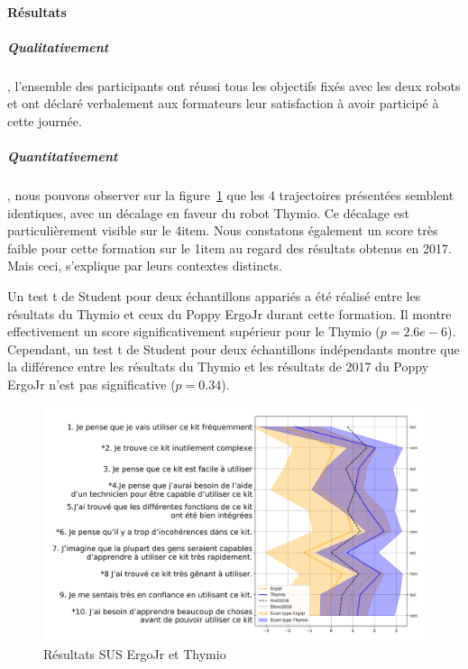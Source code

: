         \paragraph{Résultats}
            \subparagraph{Qualitativement},
                l'ensemble des participants ont réussi tous les objectifs fixés avec les deux robots et ont déclaré verbalement aux formateurs leur satisfaction à avoir participé à cette journée.
            \subparagraph{Quantitativement},
                nous pouvons observer sur la figure~\ref{fig:sus_vs_thymio} que les 4 trajectoires présentées semblent identiques, avec un décalage en faveur du robot Thymio. Ce décalage est particulièrement visible sur le 4\ieme item. Nous constatons également un score très faible pour cette formation sur le 1\ier item au regard des résultats obtenus en 2017. Mais ceci, s'explique par leurs contextes distincts.\par%
                Un test t de Student pour deux échantillons appariés a été réalisé entre les résultats du Thymio et ceux du Poppy ErgoJr durant cette formation. Il montre effectivement un score significativement supérieur pour le Thymio ($p=2.6e-6$). Cependant, un test t de Student pour deux échantillons indépendants montre que la différence entre les résultats du Thymio et les résultats de 2017 du Poppy ErgoJr n'est pas significative ($p=0.34$).
                \begin{figure}[!h]
                    \centering
                    \includegraphics[width=0.9\linewidth]{Figures/Desprez_eiah-sus.png}
                    \caption{Résultats SUS ErgoJr et Thymio~}\label{fig:sus_vs_thymio}
                \end{figure}\par%
